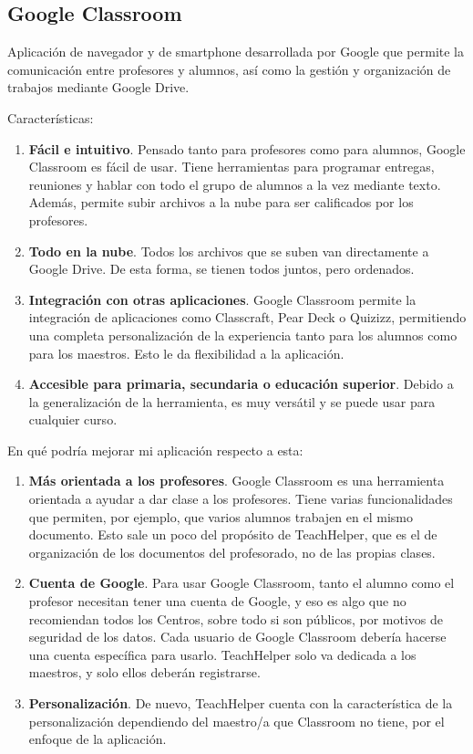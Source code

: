 \subsection{Google Classroom}

Aplicación de navegador y de smartphone desarrollada por Google que permite la comunicación entre profesores y alumnos, así como la gestión y organización de trabajos mediante Google Drive.

Características:

\begin{enumerate}
	\item \textbf{Fácil e intuitivo}. Pensado tanto para profesores como para alumnos, Google Classroom es fácil de usar. Tiene herramientas para programar entregas, reuniones y hablar con todo el grupo de alumnos a la vez mediante texto. Además, permite subir archivos a la nube para ser calificados por los profesores.
	\item \textbf{Todo en la nube}. Todos los archivos que se suben van directamente a Google Drive. De esta forma, se tienen todos juntos, pero ordenados.
	\item \textbf{Integración con otras aplicaciones}. Google Classroom permite la integración de aplicaciones como Classcraft, Pear Deck o Quizizz, permitiendo una completa personalización de la experiencia tanto para los alumnos como para los maestros. Esto le da flexibilidad a la aplicación.
	\item \textbf{Accesible para primaria, secundaria o educación superior}. Debido a la generalización de la herramienta, es muy versátil y se puede usar para cualquier curso.
\end{enumerate}

En qué podría mejorar mi aplicación respecto a esta:

\begin{enumerate}
	\item \textbf{Más orientada a los profesores}. Google Classroom es una herramienta orientada a ayudar a dar clase a los profesores. Tiene varias funcionalidades que permiten, por ejemplo, que varios alumnos trabajen en el mismo documento. Esto sale un poco del propósito de TeachHelper, que es el de organización de los documentos del profesorado, no de las propias clases.
	\item \textbf{Cuenta de Google}. Para usar Google Classroom, tanto el alumno como el profesor necesitan tener una cuenta de Google, y eso es algo que no recomiendan todos los Centros, sobre todo si son públicos, por motivos de seguridad de los datos. Cada usuario de Google Classroom debería hacerse una cuenta específica para usarlo. TeachHelper solo va dedicada a los maestros, y solo ellos deberán registrarse.
	\item \textbf{Personalización}. De nuevo, TeachHelper cuenta con la característica de la personalización dependiendo del maestro/a que Classroom no tiene, por el enfoque de la aplicación.
\end{enumerate}
	

